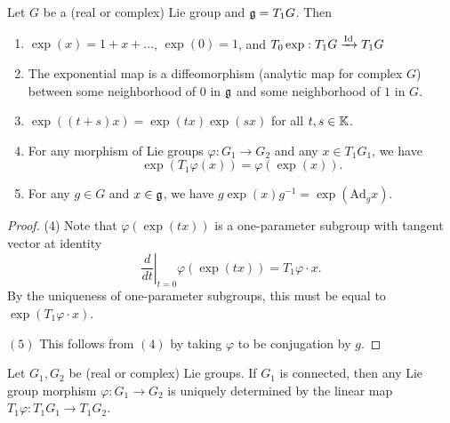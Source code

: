 \begin{theorem}[Summary]
  Let $G$ be a (real or complex)
  Lie group and
  $\mathfrak{g} = T_1 G$. Then
  \begin{enumerate}
    \item $\exp(x) = 1 + x + \dots$,
      $\exp(0) = 1$, and $T_0 \exp : T_1 G \xrightarrow{\operatorname{Id}} T_1 G$
    \item The exponential map is a
      diffeomorphism (analytic map
      for complex $G$) between some
      neighborhood of $0$ in $\mathfrak{g}$ and
      some neighborhood of $1$ in $G$.
    \item $\exp((t + s)x) = \exp(tx) \exp(sx)$
      for all $t, s \in \mathbb{K}$.
    \item For any morphism of
      Lie groups $\varphi : G_1 \to G_2$ and
      any $x \in T_1 G_1$, we have
      \[
        \exp(T_1 \varphi(x))
        = \varphi(\exp(x)).
      \]
    \item For any $g \in G$ and
      $x \in \mathfrak{g}$, we have
      $g \exp(x) g^{-1}
        = \exp(\mathrm{Ad}_g x)$.
  \end{enumerate}
\end{theorem}

\begin{proof}
  (4) Note that $\varphi(\exp(tx))$
  is a one-parameter subgroup
  with tangent vector at identity
  \[
    \left.\frac{d}{dt}\right|_{t = 0}
      \varphi(\exp(tx))
      = T_1 \varphi \cdot x.
  \]
  By the uniqueness of
  one-parameter subgroups, this must
  be equal to $\exp(T_1 \varphi \cdot x)$.

  $(5)$ This follows
  from $(4)$ by taking
  $\varphi$ to be conjugation by $g$.
\end{proof}

\begin{prop}
  Let $G_1, G_2$ be (real or complex)
  Lie groups. If $G_1$ is connected,
  then any Lie group morphism
  $\varphi : G_1 \to G_2$ is
  uniquely determined by the
  linear map
  $T_1 \varphi : T_1 G_1 \to T_1 G_2$.
\end{prop}


